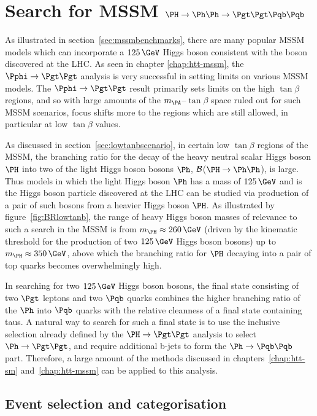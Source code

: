 \chapter{Search for MSSM $\PH \to \Ph\Ph \to \Pgt\Pgt \Pqb\Pqb$}
\label{chap:Hhh}

As illustrated in section~\ref{sec:mssmbenchmarks}, there are many popular
\ac{MSSM} models which can incorporate a $125\,\GeV$ Higgs boson consistent with the boson
discovered at the LHC. As seen in chapter \ref{chap:htt-mssm}, the 
$\Pphi \to \Pgt\Pgt$ analysis is very successful in 
setting limits on various \ac{MSSM} models. The $\Pphi \to \Pgt \Pgt$ result primarily sets
limits on the high $\tan\beta$ regions, and so with large amounts of the
$m_{\PA}$--$\tan\beta$ space ruled out for such \ac{MSSM} scenarios, focus shifts more 
to the regions which are still allowed, in particular at low $\tan\beta$ values.

As discussed in section~\ref{sec:lowtanbscenario}, in certain low $\tan\beta$ regions 
of the \ac{MSSM}, the branching ratio for the
decay of the heavy neutral scalar Higgs boson $\PH$ into two of the light Higgs boson
bosons $\Ph$, $\cal{B}$($\PH \to \Ph\Ph$), is large. Thus models in which the
light Higgs boson $\Ph$ has a mass of $125\,\GeV$ and is the Higgs boson particle discovered at the
LHC can be studied via production of a pair of such bosons from a
heavier Higgs boson $\PH$. As illustrated by figure~\ref{fig:BRlowtanb}, the range of heavy 
Higgs boson masses of relevance to such a search in the \ac{MSSM} is from $m_{\PH}\approx260\,\GeV$ 
(driven by the kinematic threshold for the production of two $125\,\GeV$ Higgs boson
bosons) up to $m_{\PH}\approx350\,\GeV$, above which the branching ratio for 
$\PH$ decaying into a pair of top quarks becomes overwhelmingly high.

In searching for two $125\,\GeV$ Higgs boson bosons, the final state consisting of two
$\Pgt$ leptons and two $\Pqb$ quarks combines the higher branching ratio of the
$\Ph$ into $\Pqb$ quarks with the relative cleanness of a final state containing
taus. A natural way to search for such a final state is to use the inclusive
selection already defined by the $\PH\to\Pgt\Pgt$ analysis to select $\Ph\to\Pgt\Pgt$, 
and require additional b-jets to form the $\Ph\to\Pqb\Pqb$ part. 
Therefore, a large amount of the methods discussed in chapters~\ref{chap:htt-sm} 
and~\ref{chap:htt-mssm} can be applied to this analysis.

\section{Event selection and categorisation}
\label{sec:HhhEventSelection}


